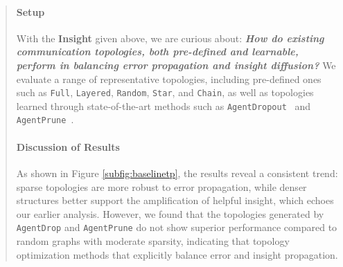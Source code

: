 \documentclass[11pt]{article}
\begin{document}
\begin{abstract}
\paragraph{Setup} 
With the \textbf{\textcolor{deepblue}{Insight}} given above, we are curious about: \textbf{\textit{How do existing communication topologies, both pre-defined and learnable, perform in balancing error propagation and insight diffusion?}} 
We evaluate a range of representative topologies, including pre-defined ones such as \texttt{Full}, \texttt{Layered}, \texttt{Random}, \texttt{Star}, and \texttt{Chain}, as well as topologies learned through state-of-the-art methods such as \texttt{AgentDropout}~\cite{wang2025agentdropout} and \texttt{AgentPrune}~\cite{zhang2024cut}. 
\vspace{-6pt}
\paragraph{Discussion of Results} 
As shown in Figure \ref{subfig:baselinetp}, the results reveal a consistent trend: sparse topologies are more robust to error propagation, while denser structures better support the amplification of helpful insight, which echoes our earlier analysis. However, we found that the topologies generated by \texttt{AgentDrop} and \texttt{AgentPrune} do not show superior performance compared to random graphs with moderate sparsity, indicating that topology optimization methods that explicitly balance error and insight propagation. 


\end{abstract}
\end{document}
